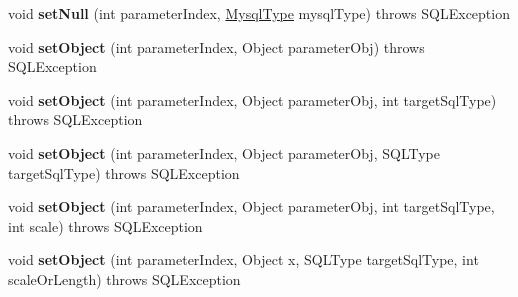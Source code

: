 \begin{DoxyCompactItemize}
\item 
\mbox{\label{classcom_1_1mysql_1_1cj_1_1jdbc_1_1_client_prepared_statement_aa53b4fe84756e62cb190a9218a8ec95b}} 
void {\bfseries set\+Null} (int parameter\+Index, \mbox{\hyperlink{enumcom_1_1mysql_1_1cj_1_1_mysql_type}{Mysql\+Type}} mysql\+Type)  throws S\+Q\+L\+Exception 
\item 
\mbox{\label{classcom_1_1mysql_1_1cj_1_1jdbc_1_1_client_prepared_statement_a451a40535568626b22b4f25efcf6c1b7}} 
void {\bfseries set\+Object} (int parameter\+Index, Object parameter\+Obj)  throws S\+Q\+L\+Exception 
\item 
\mbox{\label{classcom_1_1mysql_1_1cj_1_1jdbc_1_1_client_prepared_statement_a31009d98b9af8a8b478fcb2cf6a18c66}} 
void {\bfseries set\+Object} (int parameter\+Index, Object parameter\+Obj, int target\+Sql\+Type)  throws S\+Q\+L\+Exception 
\item 
\mbox{\label{classcom_1_1mysql_1_1cj_1_1jdbc_1_1_client_prepared_statement_a4eafbeb86813ff6ed2b2230591acb02c}} 
void {\bfseries set\+Object} (int parameter\+Index, Object parameter\+Obj, S\+Q\+L\+Type target\+Sql\+Type)  throws S\+Q\+L\+Exception 
\item 
\mbox{\label{classcom_1_1mysql_1_1cj_1_1jdbc_1_1_client_prepared_statement_a977059e7887ef311143630f64b8c4ec9}} 
void {\bfseries set\+Object} (int parameter\+Index, Object parameter\+Obj, int target\+Sql\+Type, int scale)  throws S\+Q\+L\+Exception 
\item 
\mbox{\label{classcom_1_1mysql_1_1cj_1_1jdbc_1_1_client_prepared_statement_aad13bcb6ca30f06be1995faea1b06581}} 
void {\bfseries set\+Object} (int parameter\+Index, Object x, S\+Q\+L\+Type target\+Sql\+Type, int scale\+Or\+Length)  throws S\+Q\+L\+Exception 
\item 
\mbox{\label{classcom_1_1mysql_1_1cj_1_1jdbc_1_1_client_prepared_statement_ab5f7a37435847dcb4ab8d3c5344089a3}} 

\end{DoxyCompactItemize}
